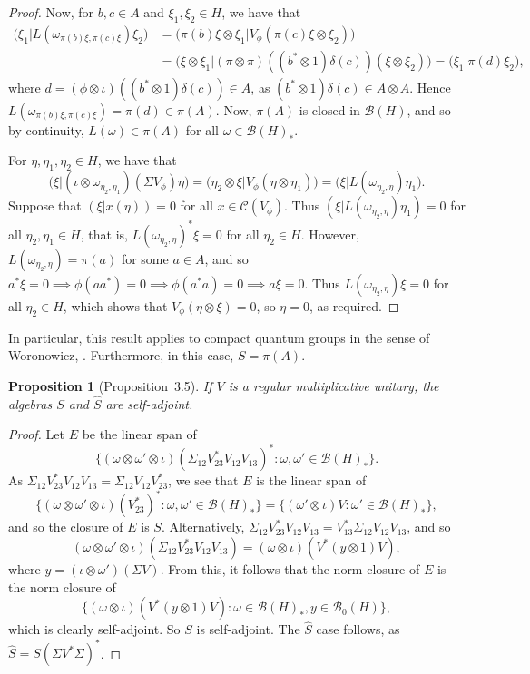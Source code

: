 \documentclass[a4paper,12pt]{article}
\theoremstyle{plain}
\newtheorem{proposition}{Proposition}[section]
\theoremstyle{definition}
\newcommand{\mc}{\mathcal}
\begin{document}
\begin{proof}
Now, for $b,c\in A$ and $\xi_1,\xi_2\in H$, we have that
\begin{align*}
\big( \xi_1 \big| L(\omega_{\pi(b)\xi,\pi(c)\xi})\xi_2 \big)
&= \big( \pi(b)\xi\otimes\xi_1 \big| V_\phi( \pi(c)\xi\otimes\xi_2 ) \big) \\
&= \big( \xi\otimes\xi_1 \big| (\pi\otimes\pi)
   ((b^*\otimes 1)\delta(c))(\xi\otimes\xi_2) \big)
= \big( \xi_1 \big| \pi(d) \xi_2 \big),
\end{align*}
where $d = (\phi\otimes\iota)((b^*\otimes 1)\delta(c))\in A$, as
$(b^*\otimes 1)\delta(c) \in A\otimes A$.
Hence $L(\omega_{\pi(b)\xi,\pi(c)\xi}) = \pi(d) \in \pi(A)$.
Now, $\pi(A)$ is closed in $\mc B(H)$, and so by continuity,
$L(\omega)\in\pi(A)$ for all $\omega\in\mc B(H)_*$.

For $\eta,\eta_1,\eta_2\in H$, we have that
\[ \big( \xi \big| (\iota\otimes\omega_{\eta_2,\eta_1})(\Sigma V_\phi)
   \eta \big)
= \big( \eta_2\otimes\xi \big| V_\phi(\eta\otimes\eta_1) \big)
= \big( \xi \big| L(\omega_{\eta_2,\eta}) \eta_1 \big). \]
Suppose that $(\xi|x(\eta))=0$ for all $x\in\mc C(V_\phi)$.  Thus
$(\xi|L(\omega_{\eta_2,\eta})\eta_1)=0$ for all $\eta_2,\eta_1\in H$,
that is, $L(\omega_{\eta_2,\eta})^*\xi=0$ for all $\eta_2\in H$.
However, $L(\omega_{\eta_2,\eta})=\pi(a)$ for some $a\in A$, and so
$a^*\xi=0 \implies \phi(aa^*)=0 \implies \phi(a^*a)=0 \implies a\xi=0$.
Thus $L(\omega_{\eta_2,\eta})\xi=0$ for all $\eta_2\in H$, which
shows that $V_{\phi}(\eta\otimes\xi)=0$, so $\eta=0$, as required.
\end{proof}

In particular, this result applies to compact quantum groups in the
sense of Woronowicz, \cite{r54}.  Furthermore, in this case, $S=\pi(A)$.

\begin{proposition}[Proposition~3.5]\label{prop:6}
If $V$ is a regular multiplicative unitary, the algebras $S$ and $\hat S$
are self-adjoint.
\end{proposition}
\begin{proof}
Let $E$ be the linear span of
\[ \big\{ (\omega\otimes\omega'\otimes\iota)(\Sigma_{12} V_{23}^*
V_{12} V_{13})^* : \omega,\omega'\in\mc B(H)_* \big\}. \]
As $\Sigma_{12} V_{23}^* V_{12} V_{13} = \Sigma_{12} V_{12} V_{23}^*$,
we see that $E$ is the linear span of
\[ \big\{ (\omega\otimes\omega'\otimes\iota)(V_{23}^*)^*
: \omega,\omega'\in\mc B(H)_* \big\}
= \big\{ (\omega'\otimes\iota)V : \omega'\in\mc B(H)_* \big\}, \]
and so the closure of $E$ is $S$.  Alternatively,
$\Sigma_{12} V_{23}^* V_{12} V_{13} = V_{13}^* \Sigma_{12} V_{12} V_{13}$,
and so
\[ (\omega\otimes\omega'\otimes\iota)(\Sigma_{12} V_{23}^* V_{12} V_{13})
= (\omega\otimes\iota)(V^*(y\otimes 1)V), \]
where $y=(\iota\otimes\omega')(\Sigma V)$.	From this, it follows that
the norm closure of $E$ is the norm closure of
\[ \big\{ (\omega\otimes\iota)(V^*(y\otimes 1)V) :
\omega\in\mc B(H)_*, y\in\mc B_0(H) \big\}, \]
which is clearly self-adjoint.  So $S$ is self-adjoint.  The $\hat S$
case follows, as $\hat S=S(\Sigma V^*\Sigma)^*$.
\end{proof}
\end{document}

